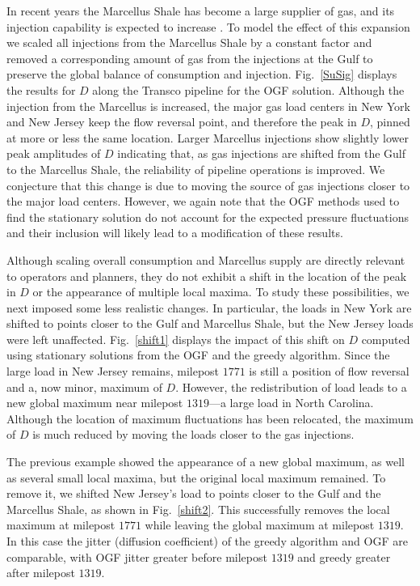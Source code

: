 \documentclass[10pt, conference, compsocconf]{IEEEtran}
\begin{document}
In recent years the Marcellus Shale has become a large supplier of
gas, and its injection capability is expected to increase \cite{NERC2013-gas-grid}.
To model the effect of this expansion we scaled all injections from the
Marcellus Shale by a constant factor and removed a corresponding amount of
gas from the injections at the Gulf to preserve the global balance
of consumption and injection.  Fig.~\ref{SuSig} displays the results for $D$ along the Transco pipeline for the OGF solution. Although the injection from the Marcellus is increased, the major gas load centers in New York and New Jersey keep the flow reversal point, and therefore the peak in $D$, pinned at more or less the same location. Larger Marcellus injections show slightly lower peak amplitudes of $D$ indicating that, as gas injections are shifted from the Gulf to the
Marcellus Shale, the reliability of pipeline operations is improved. We conjecture that this change is due to moving the source of gas injections closer to the major load centers.  However, we again note that the OGF methods used to find the stationary solution do not account for the expected pressure fluctuations and their inclusion will likely lead to a modification of these results.

Although scaling overall consumption and Marcellus supply are directly relevant to operators and planners, they do not exhibit a shift in the location of the peak in $D$ or the appearance of multiple local maxima. To study these possibilities, we next imposed some less realistic changes.
In particular, the loads in New York are shifted to points closer to the Gulf and Marcellus Shale, but the New Jersey loads were left unaffected.  Fig.~\ref{shift1} displays the impact of this shift on $D$ computed using stationary solutions from the OGF and the greedy algorithm.
Since the large load in New Jersey remains, milepost $1771$ is still a position
of flow reversal and a, now minor, maximum of $D$. However, the redistribution of load leads to a new global maximum near milepost $1319$---a large load in North Carolina.  Although the location of maximum fluctuations has been relocated, the maximum of $D$ is much reduced by moving the loads closer to the gas injections.

The previous example showed the appearance of a new global maximum, as well as several small local maxima, but the original local maximum remained.  To remove it, we shifted New Jersey's load to points closer to the Gulf and the Marcellus Shale, as shown in Fig.~\ref{shift2}.
This successfully removes the local maximum at milepost $1771$ while leaving the global maximum at milepost $1319$. In this case the jitter (diffusion coefficient) of the greedy algorithm and OGF
are comparable, with OGF jitter greater before milepost $1319$ and greedy greater after milepost $1319$.
\end{document}

